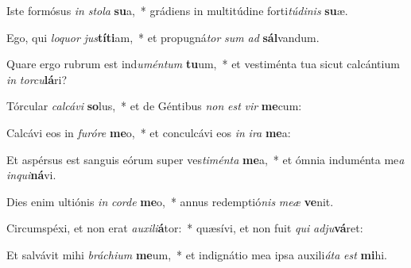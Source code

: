 \item Iste formósus \textit{in} \textit{sto}\textit{la} \textbf{su}a,~* grádiens in multitúdine forti\textit{tú}\textit{di}\textit{nis} \textbf{su}æ.
\item Ego, qui \textit{lo}\textit{quor} \textit{jus}\textbf{tí}\textbf{ti}am,~* et propugná\textit{tor} \textit{sum} \textit{ad} \textbf{sál}vandum.
\item Quare ergo rubrum est ind\textit{u}\textit{mén}\textit{tum} \textbf{tu}um,~* et vestiménta tua sicut calcántium \textit{in} \textit{tor}\textit{cu}\textbf{lá}ri?
\item Tórcular \textit{cal}\textit{cá}\textit{vi} \textbf{so}lus,~* et de Géntibus \textit{non} \textit{est} \textit{vir} \textbf{me}cum:
\item Calcávi eos in \textit{fu}\textit{ró}\textit{re} \textbf{me}o,~* et conculcávi eos \textit{in} \textit{i}\textit{ra} \textbf{me}a:
\item Et aspérsus est sanguis eórum super ves\textit{ti}\textit{mén}\textit{ta} \textbf{me}a,~* et ómnia induménta me\textit{a} \textit{in}\textit{qui}\textbf{ná}vi.
\item Dies enim ultiónis \textit{in} \textit{cor}\textit{de} \textbf{me}o,~* annus redemptió\textit{nis} \textit{me}\textit{æ} \textbf{ve}nit.
\item Circumspéxi, et non erat \textit{au}\textit{xi}\textit{li}\textbf{á}tor:~* quæsívi, et non fuit \textit{qui} \textit{ad}\textit{ju}\textbf{vá}ret:
\item Et salvávit mihi \textit{brá}\textit{chi}\textit{um} \textbf{me}um,~* et indignátio mea ipsa auxili\textit{á}\textit{ta} \textit{est} \textbf{mi}hi.
